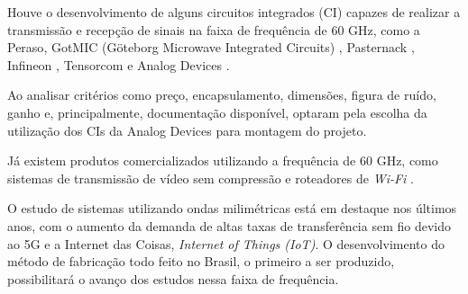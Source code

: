 Houve o desenvolvimento de alguns circuitos integrados (CI) capazes de realizar a transmissão e recepção de sinais na faixa de frequência de 60 GHz, como a Peraso\cite{Peraso}, GotMIC (Göteborg Microwave Integrated Circuits) \cite{gotmica}, Pasternack \cite{pasternack}, Infineon \cite{infineon}, Tensorcom \cite{tensorcom} e Analog Devices \cite{hmc6300}.

Ao analisar critérios como preço, encapsulamento, dimensões, figura de ruído, ganho e, principalmente, documentação disponível, \citeauthor{TCC} optaram pela escolha da utilização dos CIs da Analog Devices para montagem do projeto.

Já existem produtos comercializados utilizando a frequência de 60 GHz, como sistemas de transmissão de vídeo sem compressão \cite{iogear} e roteadores de \textit{Wi-Fi} \cite{tplink}.

O estudo de sistemas utilizando ondas milimétricas está em destaque nos últimos anos, com o aumento da demanda de altas taxas de transferência sem fio devido ao 5G e a Internet das Coisas, \textit{Internet of Things (IoT)}. O desenvolvimento do método de fabricação todo feito no Brasil, o primeiro a ser produzido, possibilitará o avanço dos estudos nessa faixa de frequência.